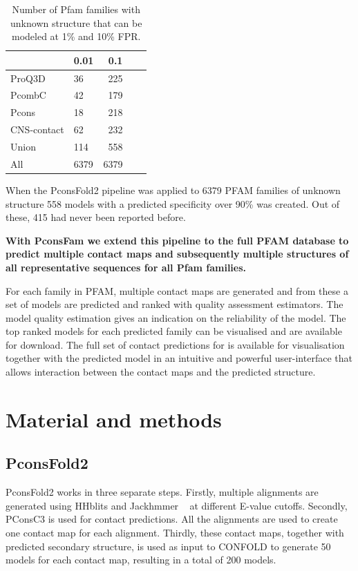 \documentclass[a4,center,fleqn]{NAR}
\begin{document}
\begin{table}[]
\centering
\caption{Number of Pfam families with unknown structure that can be modeled at
1\% and 10\% FPR.}
\label{tab:nopdb1}
    \begin{tabular}{p{}p{}rp{}r}
  \hline
 & 0.01 & 0.1 \\ 
  \hline
  ProQ3D & 36 & 225 \\ 
  PcombC & 42 & 179 \\ 
  Pcons & 18 & 218 \\ 
  CNS-contact & 62 & 232 \\  \hline 
  Union & 114 & 558 \\ 
  All & 6379 &  6379 \\ 
   \hline
\end{tabular}
\end{table}
When the PconsFold2 pipeline was applied to 6379 PFAM families of
unknown structure 558 models with a predicted specificity over 90\% was
created. Out of these, 415 had never been reported before.

{\bf With
PconsFam we extend this pipeline to the full PFAM database to predict
multiple contact maps and subsequently multiple structures of all
representative sequences for all Pfam families. }

For each family in
PFAM, multiple contact maps are generated and from these a set of
models are predicted and ranked with quality assessment
estimators. The model quality estimation gives an indication on the
reliability of the model. 
\newpage
The top ranked models for each predicted
family can be visualised and are available for download. The full set
of contact predictions for is available for visualisation together
with the predicted model in an intuitive and powerful user-interface
that allows interaction between the contact maps and the predicted
structure. 

\section{Material and methods}
\subsection{PconsFold2}
PconsFold2 works in three separate steps. Firstly, multiple alignments
are generated using HHblits and Jackhmmer ~\cite{eddy22039361} at different 
E-value cutoffs.
Secondly, PConsC3 is used for contact predictions. All the alignments are used to 
create one contact map for each alignment.
Thirdly, these contact maps, together with predicted secondary structure, is used
as input to CONFOLD to generate 50 models for each contact map, resulting in a total
of 200 models.
\end{document}
